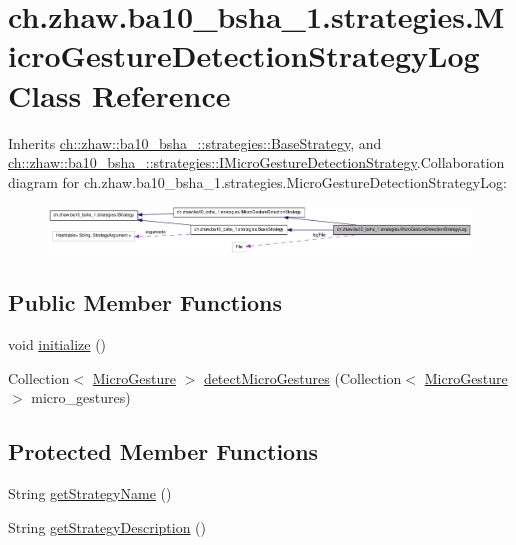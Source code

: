 \hypertarget{classch_1_1zhaw_1_1ba10__bsha__1_1_1strategies_1_1MicroGestureDetectionStrategyLog}{
\section{ch.zhaw.ba10\_\-bsha\_\-1.strategies.MicroGestureDetectionStrategyLog Class Reference}
\label{classch_1_1zhaw_1_1ba10__bsha__1_1_1strategies_1_1MicroGestureDetectionStrategyLog}
}


Inherits \hyperlink{classch_1_1zhaw_1_1ba10__bsha__1_1_1strategies_1_1BaseStrategy}{ch::zhaw::ba10\_\-bsha\_::strategies::BaseStrategy}, and \hyperlink{interfacech_1_1zhaw_1_1ba10__bsha__1_1_1strategies_1_1IMicroGestureDetectionStrategy}{ch::zhaw::ba10\_\-bsha\_::strategies::IMicroGestureDetectionStrategy}.Collaboration diagram for ch.zhaw.ba10\_\-bsha\_\-1.strategies.MicroGestureDetectionStrategyLog:\nopagebreak
\begin{figure}[H]
\begin{center}
\leavevmode
\includegraphics[width=400pt]{classch_1_1zhaw_1_1ba10__bsha__1_1_1strategies_1_1MicroGestureDetectionStrategyLog__coll__graph}
\end{center}
\end{figure}
\subsection*{Public Member Functions}
\begin{DoxyCompactItemize}
\item 
void \hyperlink{classch_1_1zhaw_1_1ba10__bsha__1_1_1strategies_1_1MicroGestureDetectionStrategyLog_a01832dff2f81e3c73212c6d7c3561e5b}{initialize} ()
\item 
Collection$<$ \hyperlink{classch_1_1zhaw_1_1ba10__bsha__1_1_1service_1_1MicroGesture}{MicroGesture} $>$ \hyperlink{classch_1_1zhaw_1_1ba10__bsha__1_1_1strategies_1_1MicroGestureDetectionStrategyLog_a52165ea7fe9595afa64e85b511c3ddbd}{detectMicroGestures} (Collection$<$ \hyperlink{classch_1_1zhaw_1_1ba10__bsha__1_1_1service_1_1MicroGesture}{MicroGesture} $>$ micro\_\-gestures)
\end{DoxyCompactItemize}
\subsection*{Protected Member Functions}
\begin{DoxyCompactItemize}
\item 
String \hyperlink{classch_1_1zhaw_1_1ba10__bsha__1_1_1strategies_1_1MicroGestureDetectionStrategyLog_a29210917e83b9e7d54635993300f8923}{getStrategyName} ()
\item 
String \hyperlink{classch_1_1zhaw_1_1ba10__bsha__1_1_1strategies_1_1MicroGestureDetectionStrategyLog_a9acf1884421d95bf09bfea17a9c11b07}{getStrategyDescription} ()
\end{DoxyCompactItemize}
